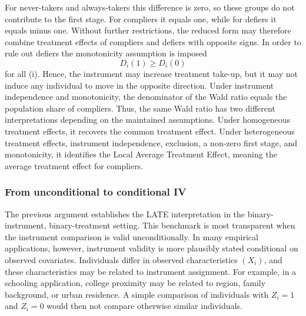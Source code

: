 \documentclass[12pt, a4paper, oneside]{article}
\theoremstyle{plain}
\theoremstyle{definition}
\begin{document}
For never-takers and always-takers this difference is zero, so these groups do not contribute to the first stage. For compliers it equals one, while for defiers it equals minus one. Without further restrictions, the reduced form may therefore combine treatment effects of compliers and defiers with opposite signs.
In order to rule out defiers the monotonicity assumption is imposed 
\begin{equation}
D_i(1) \geq D_i(0)
\end{equation}
for all (i).
Hence, the instrument may increase treatment take-up, but it may not induce any individual to move in the opposite direction.
Under instrument independence and monotonicity, the denominator of the Wald ratio equals the population share of compliers.
Thus, the same Wald ratio has two different interpretations depending on the maintained assumptions. Under homogeneous treatment effects, it recovers the common treatment effect. Under heterogeneous treatment effects, instrument independence, exclusion, a non-zero first stage, and monotonicity, it identifies the Local Average Treatment Effect, meaning the average treatment effect for compliers\citep{angrist1995identification, angrist1996identification}.





\subsubsection{From unconditional to conditional IV}

The previous argument establishes the LATE interpretation in the binary-instrument, binary-treatment setting. This benchmark is most transparent when the instrument comparison is valid unconditionally. In many empirical applications, however, instrument validity is more plausibly stated conditional on observed covariates. Individuals differ in observed characteristics $(X_i)$, and these characteristics may be related to instrument assignment. For example, in a schooling application, college proximity may be related to region, family background, or urban residence. A simple comparison of individuals with $Z_i=1$ and $Z_i=0$ would then not compare otherwise similar individuals.
\end{document}
